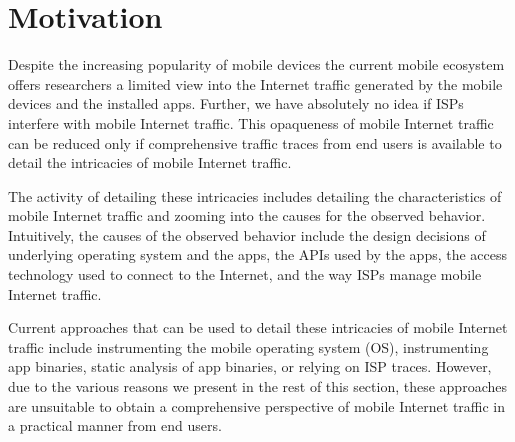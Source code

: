 \section{Motivation}
\label{sec:motivation}


Despite the increasing popularity of mobile devices the current mobile ecosystem offers researchers a limited view into the Internet traffic generated by the mobile devices and the installed apps.
Further, we have absolutely no idea if ISPs interfere with mobile Internet traffic.
This opaqueness of mobile Internet traffic can be reduced only if comprehensive traffic traces from end users is available to detail the intricacies of mobile Internet traffic. 

The activity of detailing these intricacies includes detailing the characteristics of mobile Internet traffic and zooming into the causes for the observed behavior.
Intuitively, the causes of the observed behavior include the design decisions of underlying operating system and the apps, the APIs used by the apps, the access technology used to connect to the Internet, and the way ISPs manage mobile Internet traffic. 

Current approaches that can be used to detail these intricacies of mobile Internet traffic include instrumenting the mobile operating system (OS), instrumenting app binaries, static analysis of app binaries, or relying on ISP traces. 
However, due to the various reasons we present in the rest of this section, these approaches are unsuitable to obtain a comprehensive perspective of mobile Internet traffic in a practical manner from end users. 


